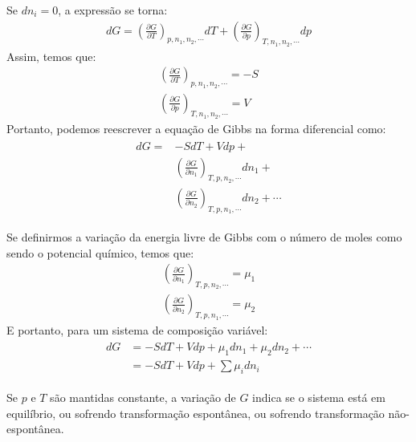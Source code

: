   \begin{corollary}
    Se $dn_i = 0$, a expressão se torna:
    \begin{gather}
      dG = \left( \frac{\partial G}{\partial T}  \right)_{p, n_1, n_2, \cdots} dT + \left( \frac{\partial G}{\partial p}  \right)_{T, n_1, n_2, \cdots} dp
    \end{gather}
    Assim, temos que:
    \begin{gather}
      \left( \frac{\partial G}{\partial T}  \right)_{p, n_1, n_2, \cdots} = -S \\
      \left( \frac{\partial G}{\partial p}  \right)_{T, n_1, n_2, \cdots} = V
    \end{gather}
    Portanto, podemos reescrever a equação de Gibbs na forma diferencial como:
    \begin{gather}
      \begin{align}
        dG = & -SdT + Vdp +                                                                      \\
             & \left( \frac{\partial G}{\partial n_1}  \right)_{T, p, n_2, \cdots} dn_1 +        \\
             & \left( \frac{\partial G}{\partial n_2}  \right)_{T, p, n_1, \cdots} dn_2 + \cdots
      \end{align}
    \end{gather}
  \end{corollary}

  \begin{theorem}
    Se definirmos a variação da energia livre de Gibbs com o número de moles como sendo o potencial químico, temos que:
    \begin{gather}
      \left( \frac{\partial G}{\partial n_1}  \right)_{T, p, n_2, \cdots} = \mu_1 \\
      \left( \frac{\partial G}{\partial n_2}  \right)_{T, p, n_1, \cdots} = \mu_2
    \end{gather}
    E portanto, para um sistema de composição variável:
    \begin{gather}
      \begin{align}
        dG & = -SdT + Vdp + \mu_1 dn_1 + \mu_2 dn_2 + \cdots \\
           & = -SdT + Vdp + \sum \mu_i dn_i
      \end{align}
    \end{gather}
  \end{theorem}
  \begin{remark}
    Se $p$ e $T$ são mantidas constante, a variação de $G$ indica se o sistema está em equilíbrio, ou sofrendo transformação espontânea, ou sofrendo transformação não-espontânea.
  \end{remark}

